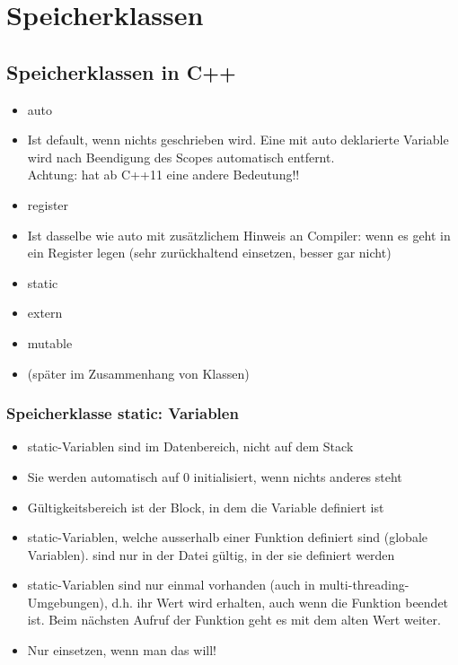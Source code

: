 
\section{Speicherklassen}
\label{sec:Speicherklassen}

\subsection{Speicherklassen in C++}
\label{sec:Speicherklassen in C++}
\begin{itemize}
	\item auto
	\item[\-] Ist default, wenn nichts geschrieben wird. Eine mit auto deklarierte Variable wird nach Beendigung des Scopes automatisch entfernt.\\
	Achtung: hat ab C++11 eine andere Bedeutung!!
	\item register
	\item[\-] Ist dasselbe wie auto mit zusätzlichem Hinweis an Compiler: wenn es geht in ein Register legen (sehr zurückhaltend einsetzen, besser gar nicht)
	\item static
	\item extern
	\item mutable
	\item[\-] (später im Zusammenhang von Klassen)
\end{itemize}

\subsubsection{Speicherklasse static: Variablen}
\label{sec:Speicherklasse static: Variablen}
\begin{itemize}
	\item static-Variablen sind im Datenbereich, nicht auf dem Stack
	\item Sie werden automatisch auf 0 initialisiert, wenn nichts anderes steht
	\item Gültigkeitsbereich ist der Block, in dem die Variable definiert ist
	\item static-Variablen, welche ausserhalb einer Funktion definiert sind (globale Variablen). sind nur in der Datei gültig, in der sie definiert werden
	\item static-Variablen sind nur einmal vorhanden (auch in multi-threading-Umgebungen), d.h. ihr Wert wird erhalten, auch wenn die Funktion beendet ist. Beim nächsten Aufruf der Funktion geht es mit dem alten Wert weiter.\color{red}
	\item Nur einsetzen, wenn man das will!\color{black}
\end{itemize}

